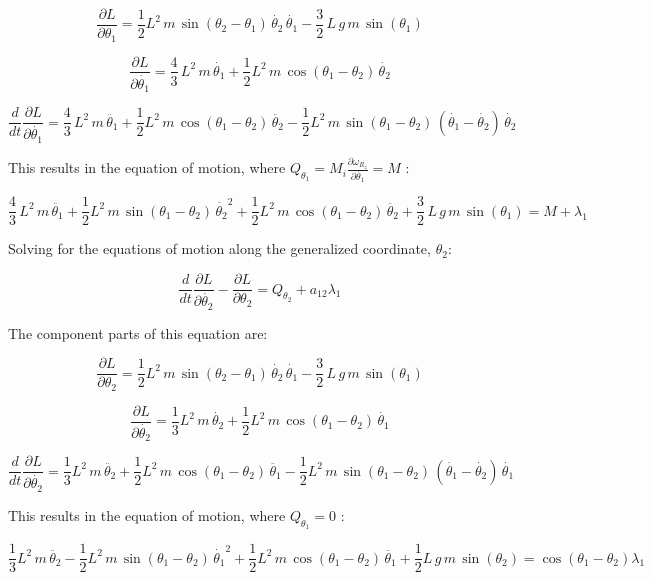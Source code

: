 \documentclass[12pt, letterpaper]{../assignment}
\begin{document}
$$ \frac{\partial L}{\partial \theta_1} = 
\frac{1}{2}L^2 \,m\,\sin \left(\theta_2 -\theta_1 \right)\,\dot{\theta_2} \,\dot{\theta_1}-
\frac{3}{2}\,L\,g\,m\,\sin \left(\theta_1 \right) $$

$$ \frac{\partial L}{\partial \dot{\theta_1}}  =
\frac{4}{3}\,L^2 \,m\,\dot{\theta_1} +
\frac{1}{2}L^2 \,m\,\cos \left(\theta_1 -\theta_2 \right)\,\dot{\theta_2}  $$

$$ \frac{d}{d t} \frac{\partial L}{\partial \dot{\theta_1}} =
\frac{4}{3}\,L^2 \,m\,\ddot{\theta_1}+
\frac{1}{2}L^2 \,m\,\cos \left(\theta_1 -\theta_2 \right)\,\ddot{\theta_2} -
\frac{1}{2}L^2 \,m\,\sin \left(\theta_1 -\theta_2 \right)\,{\left(\dot{\theta_1} -\dot{\theta_2} \right)}\,\dot{\theta_2} $$


This results in the equation of motion,
where $Q_{\theta_1} = M_i \frac{\partial \omega_{R_z}}{\partial \dot{\theta_1}} = M $ :

$$ \frac{4}{3}\,L^2 \,m\,\ddot{\theta_1} +
\frac{1}{2}L^2 \,m\,\sin \left(\theta_1 -\theta_2 \right)\,{\dot{\theta_2}}^2+
\frac{1}{2}L^2 \,m\,\cos \left(\theta_1 -\theta_2 \right)\,\ddot{\theta_2}+
\frac{3}{2}\,L\,g\,m\,\sin \left(\theta_1 \right) =
M + \lambda_1 $$

Solving for the equations of motion along the generalized coordinate, $\theta_2$:

$$ \frac{d}{d t} \frac{\partial L}{\partial \dot{\theta_2}} - \frac{\partial L}{\partial \theta_2} = 
Q_{\theta_2} + a_{12} \lambda_1 $$

The component parts of this equation are:

$$ \frac{\partial L}{\partial \theta_2} = 
\frac{1}{2}L^2 \,m\,\sin \left(\theta_2 -\theta_1 \right)\,\dot{\theta_2} \,\dot{\theta_1} -
\frac{3}{2}\,L\,g\,m\,\sin \left(\theta_1 \right) $$

$$ \frac{\partial L}{\partial \dot{\theta_2}}  =
\frac{1}{3}L^2 \,m\,\dot{\theta_2} +
\frac{1}{2}L^2 \,m\,\cos \left(\theta_1 -\theta_2 \right)\,\dot{\theta_1} $$

$$ \frac{d}{d t} \frac{\partial L}{\partial \dot{\theta_2}} =
\frac{1}{3}L^2 \,m\,\ddot{\theta_2} +
\frac{1}{2}L^2 \,m\,\cos \left(\theta_1 -\theta_2 \right)\,\ddot{\theta_1} -
\frac{1}{2}L^2 \,m\,\sin \left(\theta_1 -\theta_2 \right)\,{\left(\dot{\theta_1} -\dot{\theta_2} \right)}\,\dot{\theta_1}  $$

This results in the equation of motion,
where $Q_{\theta_1} = 0 $ :


$$ \frac{1}{3}L^2 \,m\,\ddot{\theta_2}-
\frac{1}{2}L^2 \,m\,\sin \left(\theta_1 -\theta_2 \right)\,{\dot{\theta_1}}^2 +
\frac{1}{2}L^2 \,m\,\cos \left(\theta_1 -\theta_2 \right)\,\ddot{\theta_1}+
\frac{1}{2}L\,g\,m\,\sin \left(\theta_2 \right) =
\cos \left(\theta_1 -\theta_2 \right) \lambda_1$$
\end{document}
